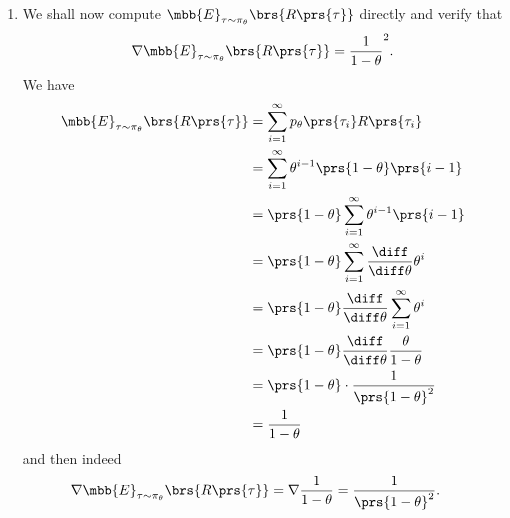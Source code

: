 \documentclass[10pt]{article}
\theoremstyle{definition}
\begin{document}
\begin{enumerate}
\begin{enumerate}[label=(\alph*)]
\item We shall now compute $\mbb{E}_{\tau \sim \pi_\theta}\brs{R\prs{\tau}}$ directly and verify that \[\nabla \mbb{E}_{\tau \sim \pi_\theta}\brs{R\prs{\tau}} = \frac{1}{1 - \theta}^2 \text{.}\]
We have
\begin{align*}
\mbb{E}_{\tau \sim \pi_\theta}\brs{R\prs{\tau}} &= \sum_{i = 1}^{\infty} p_{\theta}\prs{\tau_i} R\prs{\tau_i}
\\&=
\sum_{i=1}^{\infty} \theta^{i-1} \prs{1 - \theta} \prs{i-1}
\\&=
\prs{1 - \theta} \sum_{i = 1}^{\infty} \theta^{i-1} \prs{i-1}
\\&=
\prs{1 - \theta} \sum_{i=1}^{\infty} \frac{\diff}{\diff \theta} \theta^i
\\&=
\prs{1 - \theta} \frac{\diff}{\diff \theta} \sum_{i=1}^{\infty} \theta^i
\\&=
\prs{1 - \theta} \frac{\diff}{\diff \theta} \frac{\theta}{1 - \theta}
\\&=
\prs{1 - \theta} \cdot \frac{1}{\prs{1 - \theta}^2}
\\&= \frac{1}{1 - \theta}
\end{align*}
and then indeed
\begin{align*}
\nabla \mbb{E}_{\tau \sim \pi_\theta}\brs{R\prs{\tau}} &= \nabla \frac{1}{1 - \theta} = \frac{1}{\prs{1 - \theta}^2} \text{.}
\end{align*}
\end{enumerate}


\end{enumerate}
\end{document}
